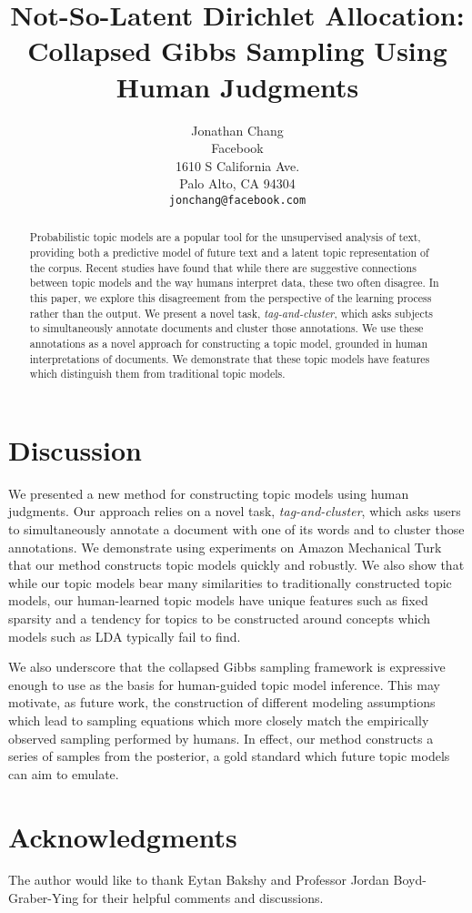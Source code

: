 \documentclass[11pt,letterpaper]{article}
\title{\vspace{-0.4in}Not-So-Latent Dirichlet Allocation: \\ 
       Collapsed Gibbs Sampling Using Human Judgments}
\author{Jonathan Chang \\ 
        Facebook \\ 
        1610 S California Ave. \\ 
        Palo Alto, CA 94304 \\ 
        \texttt{jonchang@facebook.com}}
\begin{document}
\maketitle
\vspace{-.1in}
\begin{abstract}%
  Probabilistic topic models are a popular tool for the unsupervised
  analysis of text, providing both a predictive model of future text
  and a latent topic representation of the corpus.  Recent studies
  have found that while there are suggestive connections between topic
  models and the way humans interpret data, these two often disagree.
  In this paper, we explore this disagreement from the perspective of
  the learning process rather than the output.  We present a novel
  task, \emph{tag-and-cluster}, which asks subjects to simultaneously
  annotate documents and cluster those annotations.  We use these
  annotations as a novel approach for constructing a topic model,
  grounded in human interpretations of documents.  We demonstrate that
  these topic models have features which distinguish them from
  traditional topic models.
\end{abstract}





\section{Discussion}
We presented a new method for constructing topic models using human
judgments.  Our approach relies on a novel task,
\emph{tag-and-cluster}, which asks users to simultaneously annotate a
document with one of its words and to cluster those annotations.  We
demonstrate using experiments on Amazon Mechanical Turk that our
method constructs topic models quickly and robustly.  We also show
that while our topic models bear many similarities to traditionally
constructed topic models, our human-learned topic models have unique
features such as fixed sparsity and a tendency for topics to be constructed
around concepts which models such as LDA typically fail to find.

  We also underscore that the collapsed Gibbs sampling framework is
  expressive enough to use as the basis for human-guided topic model
  inference.  This may motivate, as future work, the construction of
  different modeling assumptions which lead to sampling equations
  which more closely match the empirically observed sampling performed
  by humans.  In effect, our method constructs a series of samples
  from the posterior, a gold standard which future topic models can
  aim to emulate.
\section*{Acknowledgments}
The author would like to thank Eytan Bakshy and Professor Jordan
Boyd-Graber-Ying for their helpful comments and discussions.


{\footnotesize

}
\end{document}
